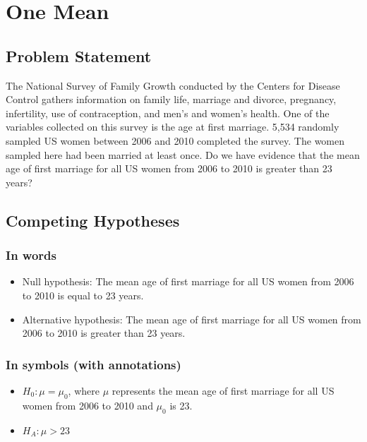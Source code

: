 \documentclass[]{tufte-book}
\providecommand{\tightlist}{%
  \setlength{\itemsep}{0pt}\setlength{\parskip}{0pt}}
\begin{document}
\section{One Mean}\label{one-mean}

\subsection{Problem Statement}\label{problem-statement}

The National Survey of Family Growth conducted by the Centers for
Disease Control gathers information on family life, marriage and
divorce, pregnancy, infertility, use of contraception, and men's and
women's health. One of the variables collected on this survey is the age
at first marriage. 5,534 randomly sampled US women between 2006 and 2010
completed the survey. The women sampled here had been married at least
once. Do we have evidence that the mean age of first marriage for all US
women from 2006 to 2010 is greater than 23 years? \citep[Tweaked a bit
from][ {[}Chapter 4{]}]{isrs2014}

\subsection{Competing Hypotheses}\label{competing-hypotheses}

\subsubsection{In words}\label{in-words}

\begin{itemize}
\item
  Null hypothesis: The mean age of first marriage for all US women from
  2006 to 2010 is equal to 23 years.
\item
  Alternative hypothesis: The mean age of first marriage for all US
  women from 2006 to 2010 is greater than 23 years.
\end{itemize}

\subsubsection{In symbols (with
annotations)}\label{in-symbols-with-annotations}

\begin{itemize}
\tightlist
\item
  \(H_0: \mu = \mu_{0}\), where \(\mu\) represents the mean age of first
  marriage for all US women from 2006 to 2010 and \(\mu_0\) is 23.
\item
  \(H_A: \mu > 23\)
\end{itemize}
\end{document}
